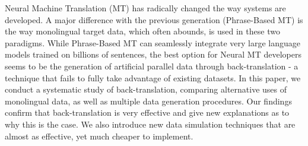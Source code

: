 Neural Machine Translation (MT) has radically changed the way systems are developed. A major difference with the previous generation (Phrase-Based MT) is the way monolingual target data, which often abounds, is used in these two paradigms. While Phrase-Based MT can seamlessly integrate very large language models trained on billions of sentences, the best option for Neural MT developers seems to be the generation of artificial parallel data through back-translation - a technique that fails to fully take advantage of existing datasets. In this paper, we conduct a systematic study of back-translation, comparing alternative uses of monolingual data, as well as multiple data generation procedures. Our findings confirm that back-translation is very effective and give new explanations as to why this is the case. We also introduce new data simulation techniques that are almost as effective, yet much cheaper to implement.
